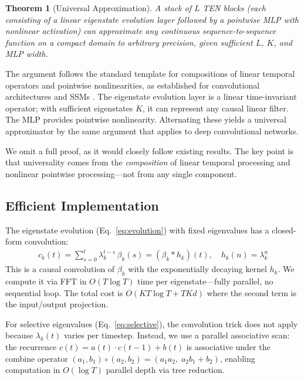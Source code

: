 \documentclass{article}
\newtheorem{theorem}{Theorem}
\begin{document}
\begin{theorem}[Universal Approximation]
\label{thm:uat}
A stack of $L$ TEN blocks (each consisting of a linear eigenstate evolution layer followed by a pointwise MLP with nonlinear activation) can approximate any continuous sequence-to-sequence function on a compact domain to arbitrary precision, given sufficient $L$, $K$, and MLP width.
\end{theorem}

The argument follows the standard template for compositions of linear temporal operators and pointwise nonlinearities, as established for convolutional architectures and SSMs \cite{li2022approximation}. The eigenstate evolution layer is a linear time-invariant operator; with sufficient eigenstates $K$, it can represent any causal linear filter. The MLP provides pointwise nonlinearity. Alternating these yields a universal approximator by the same argument that applies to deep convolutional networks.

We omit a full proof, as it would closely follow existing results. The key point is that universality comes from the \emph{composition} of linear temporal processing and nonlinear pointwise processing---not from any single component.


\subsection{Efficient Implementation}
\label{sec:fft}

The eigenstate evolution (Eq.~\ref{eq:evolution}) with fixed eigenvalues has a closed-form convolution:
\begin{align}
c_k(t) = \sum_{s=0}^{t} \lambda_k^{t-s} \, \beta_k(s) = (\beta_k \ast h_k)(t), \quad h_k(n) = \lambda_k^n
\end{align}
This is a causal convolution of $\beta_k$ with the exponentially decaying kernel $h_k$. We compute it via FFT in $O(T \log T)$ time per eigenstate---fully parallel, no sequential loop. The total cost is $O(KT \log T + TKd)$ where the second term is the input/output projection.

For selective eigenvalues (Eq.~\ref{eq:selective}), the convolution trick does not apply because $\lambda_k(t)$ varies per timestep. Instead, we use a parallel associative scan: the recurrence $c(t) = a(t) \cdot c(t-1) + b(t)$ is associative under the combine operator $(a_1, b_1) \circ (a_2, b_2) = (a_1 a_2, \; a_2 b_1 + b_2)$, enabling computation in $O(\log T)$ parallel depth via tree reduction.
\end{document}
